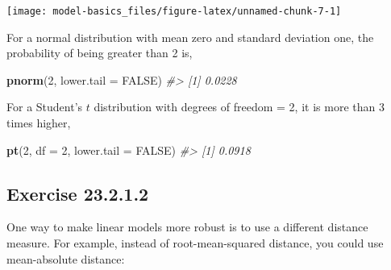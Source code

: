 \documentclass[]{book}
\newenvironment{Shaded}{\begin{snugshade}}{\end{snugshade}}
\newcommand{\CommentTok}[1]{\textcolor[rgb]{0.56,0.35,0.01}{\textit{#1}}}
\newcommand{\ControlFlowTok}[1]{\textcolor[rgb]{0.13,0.29,0.53}{\textbf{#1}}}
\newcommand{\DataTypeTok}[1]{\textcolor[rgb]{0.13,0.29,0.53}{#1}}
\newcommand{\DecValTok}[1]{\textcolor[rgb]{0.00,0.00,0.81}{#1}}
\newcommand{\KeywordTok}[1]{\textcolor[rgb]{0.13,0.29,0.53}{\textbf{#1}}}
\newcommand{\NormalTok}[1]{#1}
\newcommand{\OperatorTok}[1]{\textcolor[rgb]{0.81,0.36,0.00}{\textbf{#1}}}
\newcommand{\OtherTok}[1]{\textcolor[rgb]{0.56,0.35,0.01}{#1}}
\newcommand{\StringTok}[1]{\textcolor[rgb]{0.31,0.60,0.02}{#1}}
\theoremstyle{plain}
\theoremstyle{remark}
\begin{document}
\begin{center}\texttt{[image: model-basics\_files/figure-latex/unnamed-chunk-7-1]} \end{center}

For a normal distribution with mean zero and standard deviation one, the
probability of being greater than 2 is,

\begin{Shaded}
\begin{Highlighting}[]
\KeywordTok{pnorm}\NormalTok{(}\DecValTok{2}\NormalTok{, }\DataTypeTok{lower.tail =} \OtherTok{FALSE}\NormalTok{)}
\CommentTok{#> [1] 0.0228}
\end{Highlighting}
\end{Shaded}

For a Student's \(t\) distribution with degrees of freedom = 2, it is
more than 3 times higher,

\begin{Shaded}
\begin{Highlighting}[]
\KeywordTok{pt}\NormalTok{(}\DecValTok{2}\NormalTok{, }\DataTypeTok{df =} \DecValTok{2}\NormalTok{, }\DataTypeTok{lower.tail =} \OtherTok{FALSE}\NormalTok{)}
\CommentTok{#> [1] 0.0918}
\end{Highlighting}
\end{Shaded}

\hypertarget{exercise-23.2.1.2}{%
\subsection*{\texorpdfstring{Exercise
{23.2.1.2}}{Exercise 23.2.1.2}}\label{exercise-23.2.1.2}}

One way to make linear models more robust is to use a different distance
measure. For example, instead of root-mean-squared distance, you could
use mean-absolute distance:

\begin{Shaded}
\end{Shaded}
\end{document}
